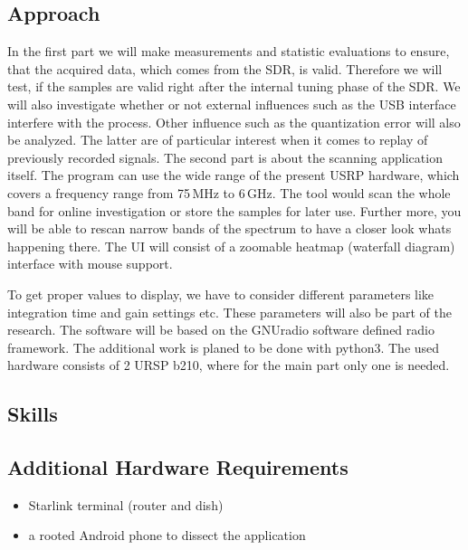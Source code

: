 \documentclass[NET,a4paper,12pt,english]{netforms}
\begin{document}
\subsection*{Approach}
In the first part we will make measurements and statistic evaluations to
ensure, that the acquired data, which comes from the SDR, is valid.  Therefore
we will test, if the samples are valid right after the internal tuning phase of
the SDR.
We will also investigate whether or not external influences such as the USB
interface interfere with the process.
Other influence such as the quantization error will also be analyzed.
The latter are of particular interest when it comes to replay of previously
recorded signals.
The second part is about the scanning application itself.
The program can use the wide range of the present USRP hardware, which covers a
frequency range from 75\,MHz to 6\,GHz.
The tool would scan the whole band for online investigation or store the
samples for later use.
Further more, you will be able to rescan narrow bands of the spectrum to have a
closer look whats happening there.
The UI will consist of a zoomable heatmap (waterfall diagram) interface with
mouse support.

To get proper values to display, we have to consider different parameters like
integration time and gain settings etc.
These parameters will also be part of the research.
The software will be based on the GNUradio software defined radio
framework.  The additional work is planed to be done with python3.
The used hardware consists of 2 URSP b210, where for the main part only one is
needed.

\subsection*{Skills}


\subsection*{Additional Hardware Requirements}
\begin{itemize}
  \item Starlink terminal (router and dish)
  \item a rooted Android phone to dissect the application
\end{itemize} 
\end{document}
